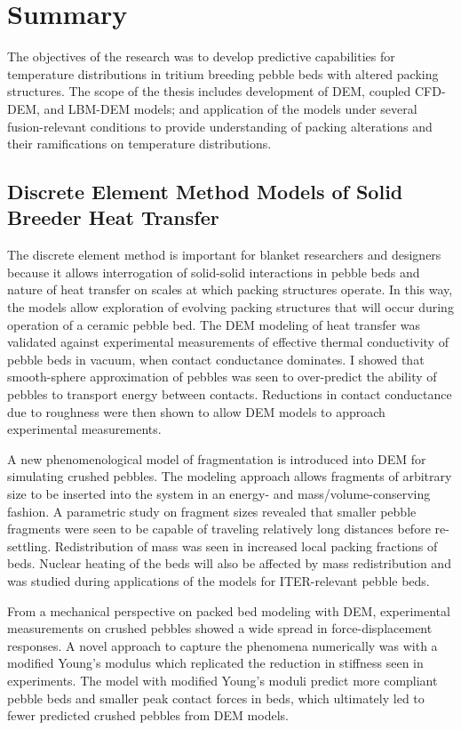 \chapter{Summary}\label{sec:summary}
The objectives of the research was to develop predictive capabilities for temperature distributions in tritium breeding pebble beds with altered packing structures. The scope of the thesis includes development of DEM, coupled CFD-DEM, and LBM-DEM models; and application of the models under several fusion-relevant conditions to provide understanding of packing alterations and their ramifications on temperature distributions.


\section{Discrete Element Method Models of Solid Breeder Heat Transfer}
The discrete element method is important for blanket researchers and designers because it allows interrogation of solid-solid interactions in pebble beds and nature of heat transfer on scales at which packing structures operate. In this way, the models allow exploration of evolving packing structures that will occur during operation of a ceramic pebble bed. The DEM modeling of heat transfer was validated against experimental measurements of effective thermal conductivity of pebble beds in vacuum, when contact conductance dominates. I showed that smooth-sphere approximation of pebbles was seen to over-predict the ability of pebbles to transport energy between contacts. Reductions in contact conductance due to roughness were then shown to allow DEM models to approach experimental measurements. 

A new phenomenological model of fragmentation is introduced into DEM for simulating crushed pebbles. The modeling approach allows fragments of arbitrary size to be inserted into the system in an energy- and mass/volume-conserving fashion. A parametric study on fragment sizes revealed that smaller pebble fragments were seen to be capable of traveling relatively long distances before re-settling. Redistribution of mass was seen in increased local packing fractions of beds. Nuclear heating of the beds will also be affected by mass redistribution and was studied during applications of the models for ITER-relevant pebble beds.

From a mechanical perspective on packed bed modeling with DEM, experimental measurements on crushed pebbles showed a wide spread in force-displacement responses. A novel approach to capture the phenomena numerically was with a modified Young's modulus which replicated the reduction in stiffness seen in experiments. The model with modified Young's moduli predict more compliant pebble beds and smaller peak contact forces in beds, which ultimately led to fewer predicted crushed pebbles from DEM models.


